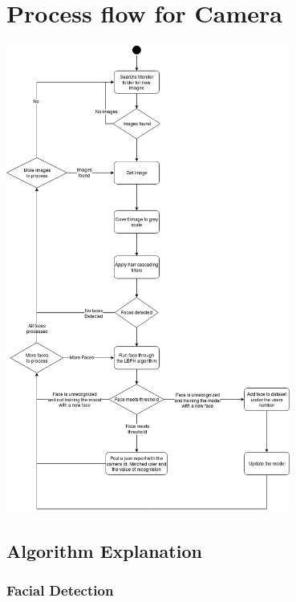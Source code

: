 \documentclass[
  english,
  a4paper,
,tablecaptionabove
]{scrartcl}
\begin{document}
\newpage

\hypertarget{process-flow-for-camera}{%
\section{Process flow for Camera}\label{process-flow-for-camera}}

\includegraphics[width=0.7\textwidth,height=\textheight]{images/ppm-images/camera-flow.png}

\newpage

\hypertarget{algorithm-explanation}{%
\subsection{Algorithm Explanation}\label{algorithm-explanation}}

\hypertarget{facial-detection}{%
\subsubsection{Facial Detection}\label{facial-detection}}
\end{document}
